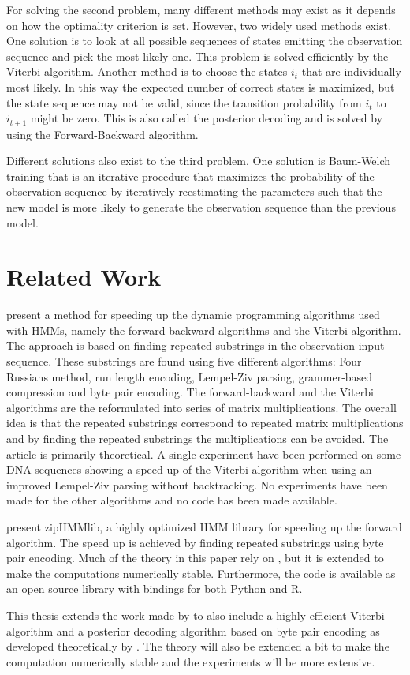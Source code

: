 For solving the second problem, many different methods may exist as it depends
on how the optimality criterion is set. However, two widely used methods exist.
One solution is to look at all possible sequences of states emitting the
observation sequence and pick the most likely one. This problem is solved
efficiently by the Viterbi algorithm. Another method is to choose the states
$i_t$ that are individually most likely. In this way the expected number of
correct states is maximized, but the state sequence may not be valid, since the
transition probability from $i_t$ to $i_{t + 1}$ might be zero. This is also
called the posterior decoding and is solved by using the Forward-Backward
algorithm.

Different solutions also exist to the third problem. One solution is Baum-Welch
training that is an iterative procedure that maximizes the probability of the
observation sequence by iteratively reestimating the parameters such that the
new model is more likely to generate the observation sequence than the previous
model.

\section{Related Work}

\citet{lifshits2009speeding} present a method for speeding up the dynamic
programming algorithms used with HMMs, namely the forward-backward algorithms
and the Viterbi algorithm. The approach is based on finding repeated substrings
in the observation input sequence. These substrings are found using five different
algorithms: Four Russians method, run length encoding, Lempel-Ziv parsing,
grammer-based compression and byte pair encoding. The forward-backward and the
Viterbi algorithms are the reformulated into series of matrix
multiplications. The overall idea is that the repeated substrings correspond to
repeated matrix multiplications and by finding the repeated substrings the
multiplications can be avoided. The article is primarily theoretical. A single
experiment have been performed on some DNA sequences showing a speed up of the
Viterbi algorithm when using an improved Lempel-Ziv parsing without
backtracking. No experiments have been made for the other algorithms and no
code has been made available.

\citet{sand2013ziphmmlib} present zipHMMlib, a highly optimized HMM library for
speeding up the forward algorithm. The speed up is achieved by finding repeated
substrings using byte pair encoding. Much of the theory in this paper rely on
\cite{lifshits2009speeding}, but it is extended to make the computations
numerically stable. Furthermore, the code is available as an open source
library with bindings for both Python and R.

This thesis extends the work made by \citet{sand2013ziphmmlib} to also include
a highly efficient Viterbi algorithm and a posterior decoding algorithm based
on byte pair encoding as developed theoretically by
\citet{lifshits2009speeding}. The theory will also be extended a bit to make
the computation numerically stable and the experiments will be more extensive.

